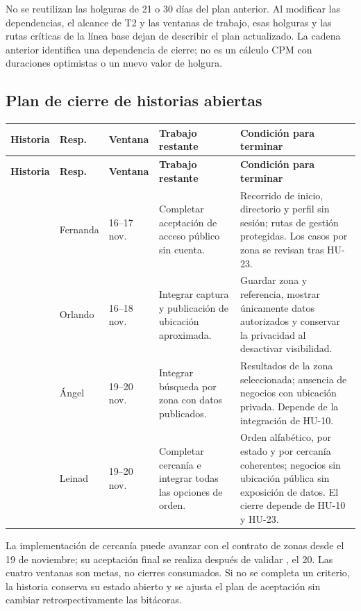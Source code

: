 No se reutilizan las holguras de 21 o 30 días del plan anterior. Al modificar
las dependencias, el alcance de T2 y las ventanas de trabajo, esas holguras y
las rutas críticas de la línea base dejan de describir el plan actualizado.
La cadena anterior identifica una dependencia de cierre; no es un cálculo
CPM con duraciones optimistas o un nuevo valor de holgura.

\subsection{Plan de cierre de historias abiertas}
\begingroup\small
\begin{longtable}{@{}L{1.5cm}L{1.6cm}L{2.2cm}L{4.2cm}L{6.5cm}@{}}
\textbf{Historia}&\textbf{Resp.}&\textbf{Ventana}&
\textbf{Trabajo restante}&\textbf{Condición para terminar}\\\midrule\endfirsthead
{}\textbf{Historia}&\textbf{Resp.}&\textbf{Ventana}&
\textbf{Trabajo restante}&\textbf{Condición para terminar}\\\midrule\endhead
\bottomrule\endfoot
{}&Fernanda&16--17 nov.&
Completar aceptación de acceso público sin cuenta.&
Recorrido de inicio, directorio y perfil sin sesión; rutas de gestión
protegidas. Los casos por zona se revisan tras HU-23.\\
&Orlando&16--18 nov.&
Integrar captura y publicación de ubicación aproximada.&
Guardar zona y referencia, mostrar únicamente datos autorizados y conservar
la privacidad al desactivar visibilidad.\\
&Ángel&19--20 nov.&
Integrar búsqueda por zona con datos publicados.&
Resultados de la zona seleccionada; ausencia de negocios con ubicación
privada. Depende de la integración de HU-10.\\
&Leinad&19--20 nov.&
Completar cercanía e integrar todas las opciones de orden.&
Orden alfabético, por estado y por cercanía coherentes; negocios sin
ubicación pública sin exposición de datos. El cierre depende de HU-10 y HU-23.\\
\end{longtable}\endgroup

La implementación de cercanía puede avanzar con el contrato de zonas desde
el 19 de noviembre; su aceptación final se realiza después de validar
, el 20. Las cuatro ventanas son metas, no cierres consumados. Si no se
completa un criterio, la historia conserva su estado abierto y se ajusta el
plan de aceptación sin cambiar retrospectivamente las bitácoras.

